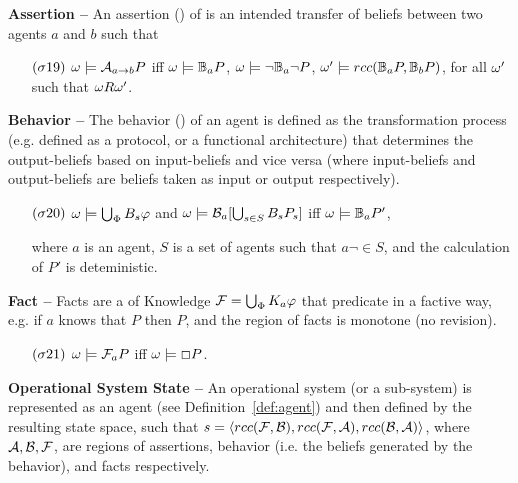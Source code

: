 \begin{definition}{\bf Assertion -- }\label{def:assertion}
	An assertion () of  is an intended transfer of beliefs between
	two agents $a$ and $b$ such that
	\begin{enumerate}[noitemsep]
		\item[$(\sigma19)$] $\omega\models\mathcal{A}_{a\rightarrow b}P$ iff
			$\omega\models\mathbb{B}_{a}{P}$, 
			$\omega\models\neg\mathbb{B}_{a}{\neg P}$, 
			$\omega'\models rcc(\mathbb{B}_{a}{P},\mathbb{B}_{b}{P})$, 
			for all $\omega'$ such that $\omega R\omega'$.
	\end{enumerate}
\end{definition}

\begin{definition}{\bf Behavior -- }\label{def:behavior}
	The behavior () of an agent is defined as the transformation process (e.g. defined as a
	protocol, or a functional architecture) that determines the
	output-beliefs based on input-beliefs and vice versa (where input-beliefs and
	output-beliefs are beliefs taken as input or output respectively).
	\begin{enumerate}[noitemsep]
		\item[$(\sigma20)$] $\omega\models\bigcup_{\Phi}B_{s}\varphi$ and $\omega\models\mathcal{B}_{a}[\bigcup_{s\in S}B_{s}P_{s}]$ iff
			$\omega\models\mathbb{B}_{a}{P'}$, 
			
		where $a$ is an agent, $S$ is a set of agents such that $a\neg\in S$, and the calculation of $P'$ is deteministic.
	\end{enumerate}
\end{definition}

\begin{definition}{\bf Fact -- }\label{def:fact}
	Facts are a  of Knowledge $\mathcal{F} = \bigcup_\Phi K_{a}\varphi$
	that predicate in a factive way, e.g.
	if $a$ knows that $P$ then $P$, and the region of facts is monotone (no revision).
	\begin{enumerate}[noitemsep]
		\item[$(\sigma21)$] $\omega\models\mathcal{F}_{a}P$ iff
			$\omega \models \Box P$. 
	\end{enumerate}
\end{definition}

\begin{definition}{\bf Operational System State --}\label{def:system}
	An operational system (or a sub-system) is represented as an agent (see Definition~\ref{def:agent}) and then defined by the resulting state space,
	such that
	$s=\langle rcc(\mathcal{F},\mathcal{B}),rcc(\mathcal{F},\mathcal{A}),rcc(\mathcal{B},\mathcal{A})\rangle$,
	where $\mathcal{A},\mathcal{B},\mathcal{F}$, are regions of assertions, behavior (i.e. the beliefs generated by the behavior), and facts respectively.
\end{definition}

